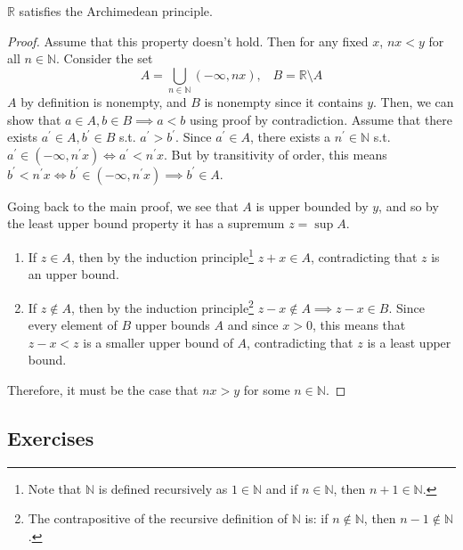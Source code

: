   \begin{theorem}
    $\mathbb{R}$ satisfies the Archimedean principle. 
  \end{theorem}
  \begin{proof}
    Assume that this property doesn't hold. Then for any fixed $x$, $nx < y$ for all $n \in \mathbb{N}$. Consider the set 
    \begin{equation}
      A = \bigcup_{n \in \mathbb{N}} (-\infty, nx), \;\;\; B = \mathbb{R} \setminus A
    \end{equation}
    $A$ by definition is nonempty, and $B$ is nonempty since it contains $y$. Then, we can show that $a \in A, b \in B \implies a < b$ using proof by contradiction. Assume that there exists $a^\prime \in A, b^\prime \in B$ s.t. $a^\prime > b^\prime$. Since $a^\prime \in A$, there exists a $n^\prime \in \mathbb{N}$ s.t. $a^\prime \in (-\infty, n^\prime x) \iff a^\prime < n^\prime x$. But by transitivity of order, this means $b^\prime < n^\prime x \iff b^\prime \in (-\infty, n^\prime x) \implies b^\prime \in A$. 

    Going back to the main proof, we see that $A$ is upper bounded by $y$, and so by the least upper bound property it has a supremum $z = \sup{A}$. 
    \begin{enumerate}
      \item If $z \in A$, then by the induction principle\footnote{Note that $\mathbb{N}$ is defined recursively as $1 \in \mathbb{N}$ and if $n \in \mathbb{N}$, then $n+1 \in \mathbb{N}$. } $z + x \in A$, contradicting that $z$ is an upper bound. 
      \item If $z \not\in A$, then by the induction principle\footnote{The contrapositive of the recursive definition of $\mathbb{N}$ is: if $n \not\in \mathbb{N}$, then $n-1 \not\in \mathbb{N}$.} $z-x \not\in A \implies z-x \in B$. Since every element of $B$ upper bounds $A$ and since $x > 0$, this means that $z-x < z$ is a smaller upper bound of $A$, contradicting that $z$ is a least upper bound. 
    \end{enumerate}
    Therefore, it must be the case that $nx > y$ for some $n \in \mathbb{N}$. 
  \end{proof}

\subsection{Exercises} 
